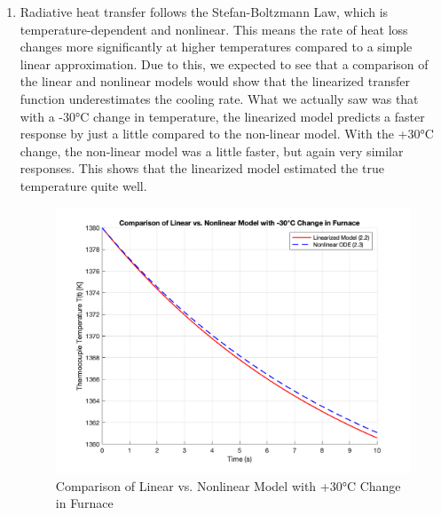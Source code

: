 \documentclass[12pt]{article}
\begin{document}
\begin{enumerate}
\begin{enumerate}
    \item
    Radiative heat transfer follows the Stefan-Boltzmann Law, which is temperature-dependent and nonlinear. This means the rate of heat loss changes more significantly at higher temperatures compared to a simple linear approximation. Due to this, we expected to see that a comparison of the linear and nonlinear models would show that the linearized transfer function underestimates the cooling rate. What we actually saw was that with a -30°C change in temperature, the linearized model predicts a faster response by just a little compared to the non-linear model. With the +30°C change, the non-linear model was a little faster, but again very similar responses. This shows that the linearized model estimated the true temperature quite well. 

    \begin{figure}[H]
      \centering
      \includegraphics[width=1\textwidth]{Figures/figure2-4a.png}
      \caption{Comparison of Linear vs. Nonlinear Model with +30°C Change in Furnace}
      \label{fig:figure24a} 
    \end{figure}


\end{enumerate}
\end{enumerate}
\end{document}
